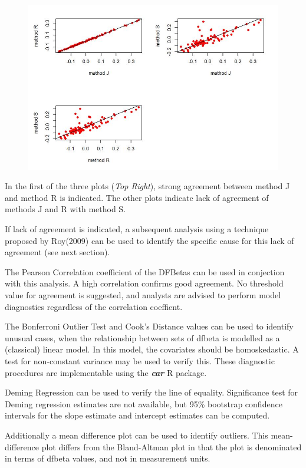 \documentclass[12pt, a4paper]{report}
\theoremstyle{plain}
\theoremstyle{definition}
\theoremstyle{remark}
\begin{document}
	\begin{figure}[h!]
		\centering
		\includegraphics[width=0.9\linewidth]{images/04-DFbetaplots}
	\end{figure}
	
	In the first of the three plots (\textit{Top Right}), strong agreement between method J and method R is indicated. The other plots indicate lack of agreement of methods J and R with method S.
	
	
	
	If lack of agreement is indicated, a subsequent analysis using a technique proposed by Roy(2009) can be used to identify the specific cause for this lack of agreement (see next section).
	
	
	The Pearson Correlation coefficient of the DFBetas can be used in conjection with this analysis. A high correlation confirms good agreement. No threshold value for agreement is suggested, and analysts are advised to perform model diagnostics regardless of the correlation coeffient.
	
	
	The Bonferroni Outlier Test and Cook's Distance values can be used to identify unusual cases, when the relationship between sets of dfbeta is modelled as a (classical) linear model. In this model, the covariates should be homoskedastic. A test for non-constant variance may be used to verify this. These diagnostic procedures are implementable using the \textbf{\textit{car}} R package.
	
	
	Deming Regression can be used to verify the line of equality. Significance test for Deming regression estimates are not available, but 95\% bootstrap confidence intervals for the slope estimate and intercept estimates can be computed.
	
	
	Additionally a mean difference plot can be used to identify outliers. This mean-difference plot differs from the Bland-Altman plot in that the plot is denominated in terms of dfbeta values, and not in measurement units.
	
\end{document}

